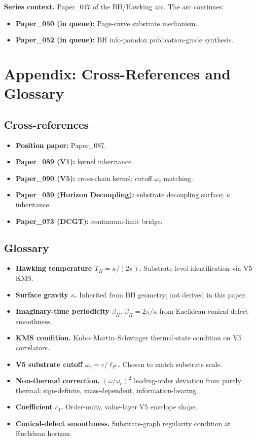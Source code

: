 \documentclass[11pt,a4paper]{article}
\begin{document}
\textbf{Series context.} Paper\_047 of the BH/Hawking arc. The arc continues:

\begin{itemize}[noitemsep]
\item \textbf{Paper\_050 (in queue):} Page-curve substrate mechanism.
\item \textbf{Paper\_052 (in queue):} BH info-paradox publication-grade synthesis.
\end{itemize}

\section*{Appendix: Cross-References and Glossary}

\subsection*{Cross-references}

\begin{itemize}[noitemsep]
\item \textbf{Position paper:} Paper\_087.
\item \textbf{Paper\_089 (V1):} kernel inheritance.
\item \textbf{Paper\_090 (V5):} cross-chain kernel; cutoff $\omega_c$ matching.
\item \textbf{Paper\_039 (Horizon Decoupling):} substrate decoupling surface; $\kappa$ inheritance.
\item \textbf{Paper\_073 (DCGT):} continuum-limit bridge.
\end{itemize}

\subsection*{Glossary}

\begin{itemize}[noitemsep]
\item \textbf{Hawking temperature $T_H = \kappa/(2\pi)$.} Substrate-level identification via V5 KMS.
\item \textbf{Surface gravity $\kappa$.} Inherited from BH geometry; not derived in this paper.
\item \textbf{Imaginary-time periodicity $\beta_H$.} $\beta_H = 2\pi/\kappa$ from Euclidean conical-defect smoothness.
\item \textbf{KMS condition.} Kubo--Martin--Schwinger thermal-state condition on V5 correlators.
\item \textbf{V5 substrate cutoff $\omega_c = c/\ell_P$.} Chosen to match substrate scale.
\item \textbf{Non-thermal correction.} $(\omega/\omega_c)^2$ leading-order deviation from purely thermal; sign-definite, mass-dependent, information-bearing.
\item \textbf{Coefficient $c_1$.} Order-unity, value-layer V5 envelope shape.
\item \textbf{Conical-defect smoothness.} Substrate-graph regularity condition at Euclidean horizon.
\end{itemize}
\end{document}
